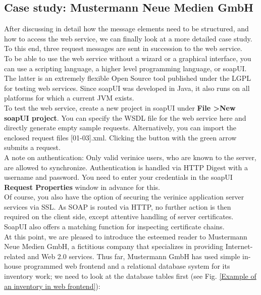 \documentclass[a4paper,10pt]{book}
\begin{document}
\subsection{ Case study: Mustermann Neue Medien GmbH}
After discussing in detail how the message elements need to be structured, and how to access the web service,
we can finally look at a more detailed case study. To this end, three request messages are sent in succession
to the web service.
\newline\\
To be able to use the web service without a wizard or a graphical interface, you can use a scripting language,
a higher level programming language, or soapUI. The latter is an extremely flexible Open Source tool published
under the LGPL for testing web services. Since soapUI was developed in Java, it also runs on all platforms for
which a current JVM exists.
\newline\\
To test the web service, create a new project in soapUI under \textbf{File \textgreater New soapUI project}.
You can specify the WSDL file for the web service here and directly generate empty sample requests. Alternatively,
you can import the enclosed request files [01-03].xml. Clicking the button with the green arrow submits a request.
\newline\\
A note on authentication: Only valid verinice users, who are known to the server, are allowed to synchronize.
Authentication is handled via HTTP Digest with a username and password. You need to enter your credentials
in the soapUI \textbf{Request Properties} window in advance for this.
\newline\\
Of course, you also have the option of securing the verinice application server services via SSL. As SOAP is routed
via HTTP, no further action is then required on the client side, except attentive handling of server certificates.
SoapUI also offers a matching function for inspecting certificate chains.
\newline\\
At this point, we are pleased to introduce the esteemed reader to Mustermann Neue Medien GmbH, a fictitious company
that specializes in providing Internet-related and Web 2.0 services. Thus far, Mustermann GmbH has used simple
in-house programmed web frontend and a relational database system for its inventory work; we need to look at the
database tables first (see Fig. \ref{Example of an inventory in web frontend}):
\end{document}
